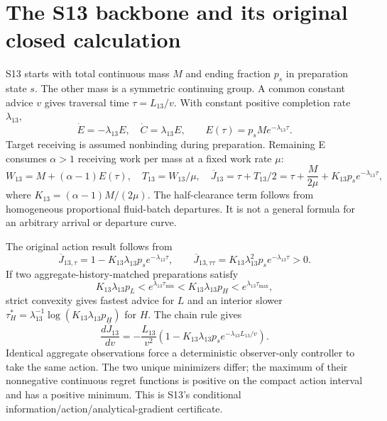 \section{The S13 backbone and its original closed calculation}
\label{sec:s13}
S13 starts with total continuous mass $M$ and ending fraction $p_s$ in
preparation state $s$. The other mass is a symmetric continuing group.
A common constant advice $v$ gives traversal time $\tau=L_{13}/v$.
With constant positive completion rate $\lambda_{13}$,
\begin{equation}
 \dot E=-\lambda_{13}E,\quad \dot C=\lambda_{13}E,
 \qquad E(\tau)=p_sM e^{-\lambda_{13}\tau}.
 \label{eq:s13transfer}
\end{equation}
Target receiving is assumed nonbinding during preparation. Remaining E
consumes $\alpha>1$ receiving work per mass at a fixed work rate $\mu$:
\begin{equation}
 W_{13}=M+(\alpha-1)E(\tau),\quad
 T_{13}=W_{13}/\mu,\quad
 \overline J_{13}=\tau+T_{13}/2
 =\tau+\frac{M}{2\mu}+K_{13}p_s e^{-\lambda_{13}\tau},
 \label{eq:s13objective}
\end{equation}
where $K_{13}=(\alpha-1)M/(2\mu)$. The half-clearance term follows
from homogeneous proportional fluid-batch departures. It is not a general
formula for an arbitrary arrival or departure curve.

The original action result follows from
\begin{equation}
 \overline J_{13,\tau}=1-K_{13}\lambda_{13}p_s e^{-\lambda_{13}\tau},
 \qquad
 \overline J_{13,\tau\tau}=K_{13}\lambda_{13}^2p_s e^{-\lambda_{13}\tau}>0.
 \label{eq:s13derivative}
\end{equation}
If two aggregate-history-matched preparations satisfy
\begin{equation}
 K_{13}\lambda_{13}p_L<e^{\lambda_{13}\tau_{\min}}
 <K_{13}\lambda_{13}p_H<e^{\lambda_{13}\tau_{\max}},
 \label{eq:s13split}
\end{equation}
strict convexity gives fastest advice for $L$ and an interior slower
$\tau_H^*=\lambda_{13}^{-1}\log(K_{13}\lambda_{13}p_H)$ for $H$.
The chain rule gives
\begin{equation}
 \frac{d\overline J_{13}}{dv}
 =-\frac{L_{13}}{v^2}
 \left(1-K_{13}\lambda_{13}p_s e^{-\lambda_{13}L_{13}/v}\right).
 \label{eq:s13speed}
\end{equation}
Identical aggregate observations force a deterministic observer-only
controller to take the same action. The two unique minimizers differ; the
maximum of their nonnegative continuous regret functions is positive on
the compact action interval and has a positive minimum. This is S13's
conditional information/action/analytical-gradient certificate.

